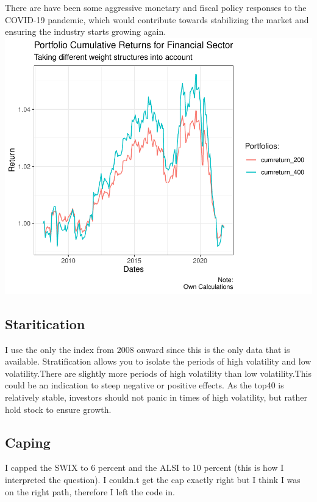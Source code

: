 \documentclass[11pt,preprint, authoryear]{elsarticle}
\numberwithin{equation}{section}
\numberwithin{figure}{section}
\numberwithin{table}{section}
\begin{document}
There are have been some aggressive monetary and fiscal policy responses
to the COVID-19 pandemic, which would contribute towards stabilizing the
market and ensuring the industry starts growing again.
\includegraphics{Question2_files/figure-latex/unnamed-chunk-4-1.pdf}

\hypertarget{staritication}{%
\subsection{Staritication}\label{staritication}}

I use the only the index from 2008 onward since this is the only data
that is available. Stratification allows you to isolate the periods of
high volatility and low volatility.There are slightly more periods of
high volatility than low volatility.This could be an indication to steep
negative or positive effects. As the top40 is relatively stable,
investors should not panic in times of high volatility, but rather hold
stock to ensure growth.

\hypertarget{caping}{%
\subsection{Caping}\label{caping}}

I capped the SWIX to 6 percent and the ALSI to 10 percent (this is how I
interpreted the question). I couldn.t get the cap exactly right but I
think I was on the right path, therefore I left the code in.


\end{document}
